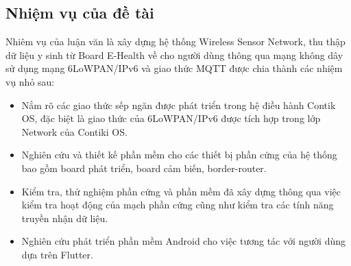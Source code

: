 \documentclass{report}
\begin{document}
\subsection{Nhiệm vụ của đề tài}
Nhiêm vụ của luận văn là xây dựng hệ thống Wireless Sensor Network, thu thập dữ liệu y sinh từ
Board E-Health về cho người dùng thông qua mạng không dây sử dụng mạng 6LoWPAN/IPv6 và giao thức MQTT được chia thành các nhiệm vụ nhỏ sau: \\
\begin{itemize}
\item Nắm rõ các giao thức sếp ngăn được phát triển trong hệ điều hành Contik OS, đặc biệt là giao thức của 6LoWPAN/IPv6 được tích hợp trong lớp Network của Contiki OS. 
\item Nghiên cứu và thiết kế phần mềm cho các thiết bị phần cứng của hệ thống bao gồm board phát triển, board cảm biến, border-router. 
\item Kiểm tra, thử nghiệm phần cứng và phần mềm đã xây dựng thông qua việc kiểm tra hoạt động của mạch phần cứng cũng như kiểm tra các tính năng truyền nhận dữ liệu. 
\item Nghiên cứu phát triển phần mềm Android cho việc tương tác với người dùng dựa trên Flutter. 
\end{itemize}
\end{document}
